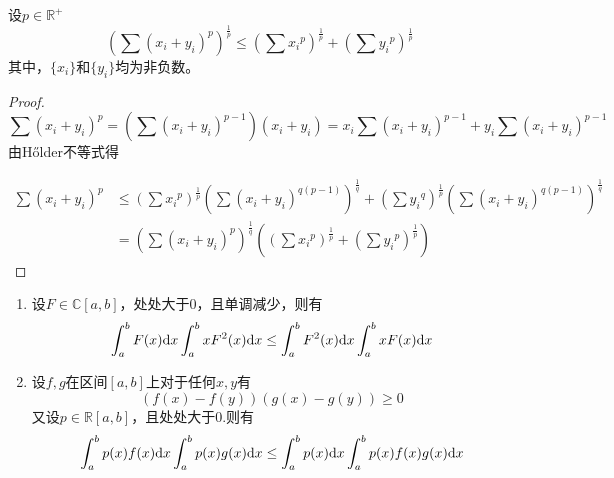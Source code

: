 \begin{theorem}[Minkowski不等式]

    设$p\in\mathbb{R}^+$
    $$\left( \sum{(x_i + y_i)}^p \right) ^{\frac{1}{p}} \leq \left(\sum{{x_i}^p}\right)^{\frac{1}{p}} + \left(\sum{{y_i}^{p}}\right)^{\frac{1}{p}}$$
    其中，$\{x_i\}$和$\{y_i\}$均为非负数。

\end{theorem}

\begin{proof}

    $$\sum{(x_i + y_i)}^p = \left( \sum{(x_i + y_i)}^{p-1} \right) (x_i + y_i) = x_i \sum{(x_i + y_i)}^{p-1} + y_i \sum{(x_i+ y_i)^{p-1}}$$
    由\textup{H{\H o}lder}不等式得
    
    \begin{align*}
        \sum{(x_i + y_i)}^p &\leq \left(\sum{{x_i}^p}\right)^{\frac{1}{p}} \left(\sum{(x_i + y_i)^{q(p-1)}}\right)^{\frac{1}{q}} + \left(\sum{{y_i}^q}\right)^{\frac{1}{p}} \left(\sum{(x_i + y_i)^{q(p-1)}}\right)^{\frac{1}{q}}\\
        &= \left( \sum{(x_i + y_i)}^p \right) ^{\frac{1}{q}} \left( \left(\sum{{x_i}^p}\right)^{\frac{1}{p}}  + \left(\sum{{y_i}^{p}}\right)^{\frac{1}{p}} \right)
    \end{align*}

\end{proof}

\begin{theorem}

    \begin{enumerate}
        
        \item 设$F\in\mathbb{C}[a,b]$，处处大于$0$，且单调减少，则有
              $$ \int_{a}^{b}{F(x)}\mathrm{d} x\int_{a}^{b}{xF^2(x)}\mathrm{d} x \leq \int_{a}^{b}{F^2(x)}\mathrm{d} x \int_{a}^{b}{xF(x)}\mathrm{d} x $$

        \item 设$f,g$在区间$[a,b]$上对于任何$x,y$有
              $$ (f(x)-f(y))(g(x)-g(y))\geq 0 $$
              又设$p\in\mathbb{R}[a,b]$，且处处大于$0$.则有
              $$ \int_{a}^{b}{p(x)f(x)}\mathrm{d} x\int_{a}^{b}{p(x)g(x)}\mathrm{d} x \leq \int_{a}^{b}{p(x)}\mathrm{d} x \int_{a}^{b}{p(x)f(x)g(x)}\mathrm{d} x $$

    \end{enumerate}

\end{theorem}

